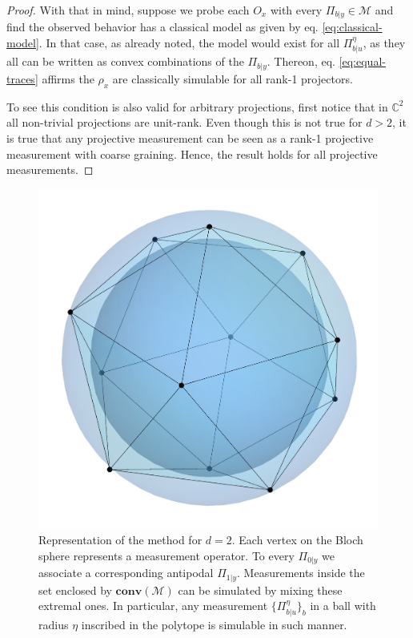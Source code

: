 \documentclass[a4paper,preprintnumbers,floatfix,superscriptaddress,pra,twocolumn,showpacs,notitlepage,longbibliography]{revtex4-2}
\begin{document}
\begin{proof}
        With that in mind, suppose we probe each $O_x$ with every $\Pi_{b \vert y} \in \mathcal{M}$ and find the observed behavior has a classical model as given by eq. \eqref{eq:classical-model}. In that case, as already noted, the model would exist for all $\Pi_{b \vert u}^\eta$, as they all can be written as convex combinations of the $\Pi_{b \vert y}$. Thereon, eq. \eqref{eq:equal-traces} affirms the $\rho_x$ are classically simulable for all rank-1 projectors.
        
        To see this condition is also valid for arbitrary projections, first notice that in $\mathbb{C}^2$ all non-trivial projections are unit-rank. Even though this is not true for $d > 2$, it is true that any projective measurement can be seen as a rank-1 projective measurement with coarse graining. Hence, the result holds for all projective measurements.
    \end{proof}
    
    \begin{figure}
        \centering
        \includegraphics[width=.7\columnwidth]{measurements-ball.png}
        \caption{Representation of the method for $d = 2$. Each vertex on the Bloch sphere represents a measurement operator. To every $\Pi_{0 \vert y}$ we associate a corresponding antipodal $\Pi_{1 \vert y}$. Measurements inside the set enclosed by $\textbf{conv}(\mathcal{M})$ can be simulated by mixing these extremal ones. In particular, any measurement $\{ \Pi_{b \vert u}^\eta \}_b$ in a ball with radius $\eta$ inscribed in the polytope is simulable in such manner.}
        \label{fig:measurements}
    \end{figure}
    
\end{document}
